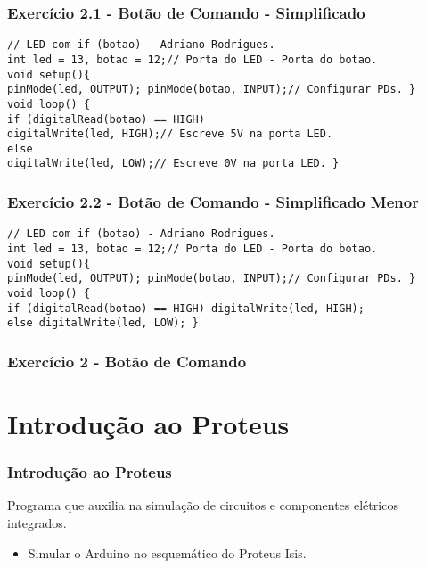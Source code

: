 \documentclass{beamer}
\begin{document}
\begin{frame}[fragile]
	\frametitle{Exercício 2.1 - Botão de Comando - Simplificado}
	
	\begin{lstlisting}[style=Arduino]
// LED com if (botao) - Adriano Rodrigues.
int led = 13, botao = 12;// Porta do LED - Porta do botao.
void setup(){
pinMode(led, OUTPUT); pinMode(botao, INPUT);// Configurar PDs. }
void loop() {
if (digitalRead(botao) == HIGH)
digitalWrite(led, HIGH);// Escreve 5V na porta LED.
else
digitalWrite(led, LOW);// Escreve 0V na porta LED. }	\end{lstlisting}
\end{frame}

\begin{frame}[fragile]
	\frametitle{Exercício 2.2 - Botão de Comando - Simplificado Menor}
	
	\begin{lstlisting}[style=Arduino]
// LED com if (botao) - Adriano Rodrigues.
int led = 13, botao = 12;// Porta do LED - Porta do botao.
void setup(){
pinMode(led, OUTPUT); pinMode(botao, INPUT);// Configurar PDs. }
void loop() {
if (digitalRead(botao) == HIGH) digitalWrite(led, HIGH);
else digitalWrite(led, LOW); }	\end{lstlisting}
\end{frame}
\begin{frame}
	\frametitle{Exercício 2 - Botão de Comando}
	\begin{center}
	\end{center}
\end{frame}

\section{Introdução ao Proteus}
\begin{frame}
	\frametitle{Introdução ao Proteus}
	\begin{center}
		 \hspace{50pt}
	\end{center}
	Programa que auxilia na simulação de circuitos e componentes elétricos integrados.\\[5pt]
	\begin{itemize}
	\item Simular o Arduino no esquemático do Proteus Isis.
	\end{itemize}
	\begin{center}
	\end{center}
\end{frame}
\end{document}
